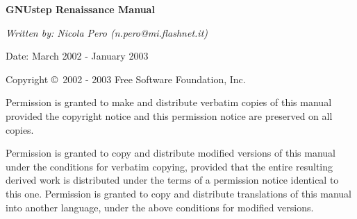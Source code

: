 %
%
%
\begin{titlepage}
\begin{flushleft}
{\phantom{begin page}}
\vskip6cm

{\LARGE\bf GNUstep Renaissance Manual\par}

\vskip1cm

{\sl Written by:  Nicola Pero (n.pero@mi.flashnet.it)

Date: March 2002 - January 2003}
\end{flushleft}

\vskip3cm

{\sc Copyright \copyright\ 2002 - 2003 Free Software Foundation, Inc.}

Permission is granted to make and distribute verbatim copies of this
manual provided the copyright notice and this permission notice are
preserved on all copies.

Permission is granted to copy and distribute modified versions of this
manual under the conditions for verbatim copying, provided that the
entire resulting derived work is distributed under the terms of a
permission notice identical to this one.  Permission is granted to
copy and distribute translations of this manual into another language,
under the above conditions for modified versions.

\end{titlepage}





